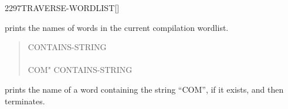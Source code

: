 \begin{worddef}{2297}{TRAVERSE-WORDLIST}[]
\begin{rationale}
		prints the names of words in the current compilation wordlist.

		\begin{quote}\ttfamily
			\word{:} CONTAINS-STRING \\
\tab 			{} 
				 
					 
				  \word{;} \\
		 COM"  CONTAINS-STRING
		 
		\end{quote}
 
		prints the name of a word containing the string
		``COM'', if it exists, and then terminates.
	\end{rationale}
\end{worddef}

